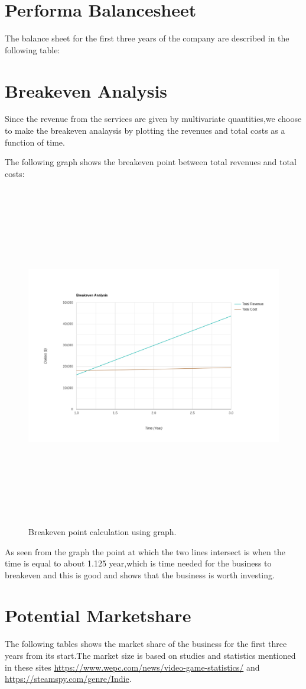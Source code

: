 \documentclass[fontsize=14pt,svgnames]{scrreprt}
\begin{document}
\section{Performa Balancesheet}
The balance sheet for the first three years of the company are described in the following table: 


\section{Breakeven Analysis}
Since the revenue from the services are given by multivariate quantities,we choose to make the breakeven analaysis by plotting the revenues and total costs as a function of time.
\par The following graph shows the breakeven point between total revenues and total costs:
\begin{figure}[H]
\centering
  \includegraphics[width=\linewidth,height=15cm]{Diagrams/Breakeven.png}
    \caption{\small{Breakeven point calculation using graph.}}
  \label{fig:1}
\end{figure}
\par As seen from the graph the point at which the two lines intersect is when the time is equal to about 1.125 year,which is time needed for the business to breakeven and this is good and shows that the business is worth investing.
\section{Potential Marketshare}
The following tables shows the market share of the business for the first three years from its start.The market size is based on studies and statistics mentioned in these sites \url{https://www.wepc.com/news/video-game-statistics/} and \url{https://steamspy.com/genre/Indie}.

\end{document}
